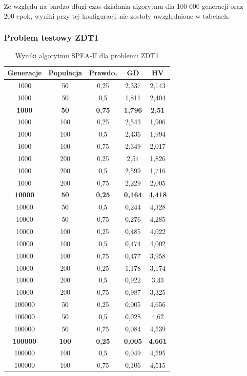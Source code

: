 \documentclass{classrep}
\begin{document}
Ze względu na bardzo długi czas działania algorytmu dla 100 000 generacji oraz 200 epok, wyniki przy tej konfiguracji nie zostały uwzględnione w tabelach.

\subsubsection{Problem testowy ZDT1}

\begin{table}[H]
\centering
\caption{Wyniki algorytmu SPEA-II dla problemu ZDT1}
\label{tab:SPEAII_ZDT1}
\begin{tabular}{|ccc|c|c|}
\hline
\textbf{Generacje} & \textbf{Populacja} & \textbf{Prawdo.} & \textbf{GD} & \textbf{HV} \\ \hline
1000 & 50 & 0,25 & 2,337 & 2,143 \\ \hline
1000 & 50 & 0,5 & 1,811 & 2,404 \\ \hline
\textbf{1000} & \textbf{50} & \textbf{0,75} & \textbf{1,796} & \textbf{2,51} \\ \hline
1000 & 100 & 0,25 & 2,543 & 1,906 \\ \hline
1000 & 100 & 0,5 & 2,436 & 1,994 \\ \hline
1000 & 100 & 0,75 & 2,349 & 2,017 \\ \hline
1000 & 200 & 0,25 & 2,54 & 1,826 \\ \hline
1000 & 200 & 0,5 & 2,599 & 1,716 \\ \hline
1000 & 200 & 0,75 & 2,229 & 2,005 \\ \hline
\textbf{10000} & \textbf{50} & \textbf{0,25} & \textbf{0,164} & \textbf{4,418} \\ \hline
10000 & 50 & 0,5 & 0,244 & 4,328 \\ \hline
10000 & 50 & 0,75 & 0,276 & 4,285 \\ \hline
10000 & 100 & 0,25 & 0,485 & 4,022 \\ \hline
10000 & 100 & 0,5 & 0,474 & 4,002 \\ \hline
10000 & 100 & 0,75 & 0,477 & 3,958 \\ \hline
10000 & 200 & 0,25 & 1,178 & 3,174 \\ \hline
10000 & 200 & 0,5 & 0,922 & 3,43 \\ \hline
10000 & 200 & 0,75 & 0,987 & 3,325 \\ \hline
100000 & 50 & 0,25 & 0,005 & 4,656 \\ \hline
100000 & 50 & 0,5 & 0,028 & 4,62 \\ \hline
100000 & 50 & 0,75 & 0,084 & 4,539 \\ \hline
\textbf{100000} & \textbf{100} & \textbf{0,25} & \textbf{0,005} & \textbf{4,661} \\ \hline
100000 & 100 & 0,5 & 0,049 & 4,595 \\ \hline
100000 & 100 & 0,75 & 0,106 & 4,515 \\ \hline
\end{tabular}
\end{table}
\end{document}
